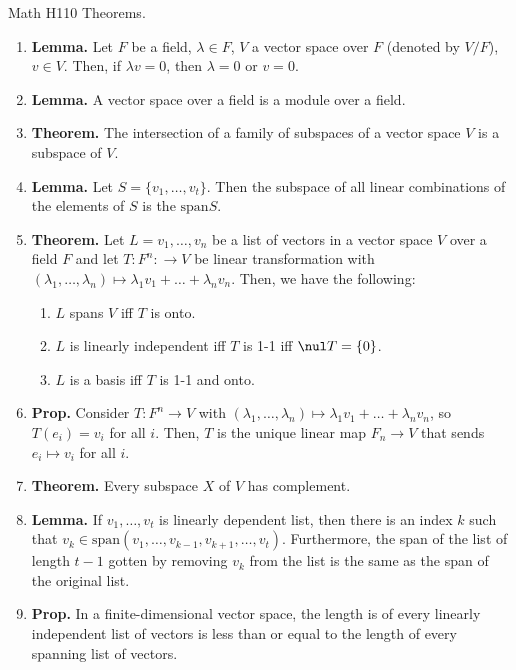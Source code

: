 

\begin{center}
    Math H110 Theorems. 
\end{center}

\begin{enumerate}
    \item \textbf{Lemma. } Let $F$ be a field, $\lambda \in F$, $V$ a vector space over $F$ (denoted by $V/F$), $v \in V$. Then, if $\lambda v = 0$, then $\lambda=0$ or $v=0$. 
    \item \textbf{Lemma. } A vector space over a field is a module over a field. 
    \item \textbf{Theorem. } The intersection of a family of subspaces of a vector space $V$ is a subspace of $V$. 
    \item \textbf{Lemma. } Let $S=\{v_1,\dots,v_t\}$. Then the subspace of all linear combinations of the elements of $S$ is the $\mathrm{span}S$. 
    \item \textbf{Theorem. } Let $L=v_1,\dots,v_n$ be a list of vectors in a vector space $V$ over a field $F$ and let $T: F^n: \to V$ be linear transformation with $(\lambda_1,\dots,\lambda_n) \mapsto \lambda_1v_1 + \dots + \lambda_nv_n$. Then, we have the following: 
    \begin{enumerate}
        \item $L$ spans $V$ iff $T$ is onto. 
        \item $L$ is linearly independent iff $T$ is 1-1 iff $\nul T = \{0\}$. 
        \item $L$ is a basis iff $T$ is 1-1 and onto. 
    \end{enumerate}
    \item \textbf{Prop. } Consider $T: F^n \to V$ with $(\lambda_1,\dots,\lambda_n) \mapsto \lambda_1v_1 + \dots + \lambda_nv_n$, so $T(e_i)=v_i$ for all $i$. Then, $T$ is the unique linear map $F_n \to V$ that sends $e_i \mapsto v_i$ for all $i$. 
    \item \textbf{Theorem. } Every subspace $X$ of $V$ has complement. 
	\item \textbf{Lemma. } If $v_1,\dots,v_t$ is linearly dependent list, then there is an index $k$ such that $v_k \in \textrm{span}(v_1,\dots,v_{k-1},v_{k+1},\dots,v_t)$. Furthermore, the span of the list of length $t-1$ gotten by removing $v_k$ from the list is the same as the span of the original list. 
	\item \textbf{Prop. } In a finite-dimensional vector space, the length is of every linearly independent list of vectors is less than or equal to the length of every spanning list of vectors. 

\end{enumerate}
